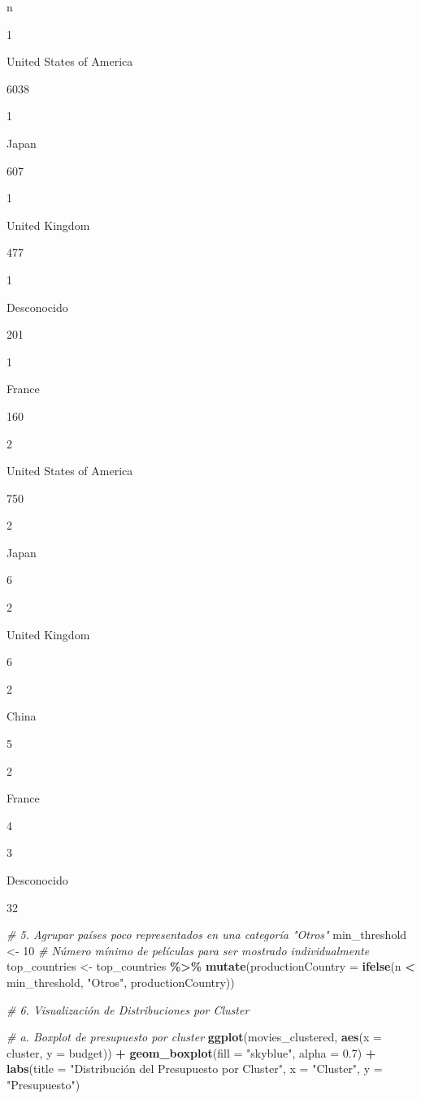 \documentclass[
]{article}
\newenvironment{Shaded}{\begin{snugshade}}{\end{snugshade}}
\newcommand{\AttributeTok}[1]{\textcolor[rgb]{0.13,0.29,0.53}{#1}}
\newcommand{\CommentTok}[1]{\textcolor[rgb]{0.56,0.35,0.01}{\textit{#1}}}
\newcommand{\DecValTok}[1]{\textcolor[rgb]{0.00,0.00,0.81}{#1}}
\newcommand{\FloatTok}[1]{\textcolor[rgb]{0.00,0.00,0.81}{#1}}
\newcommand{\FunctionTok}[1]{\textcolor[rgb]{0.13,0.29,0.53}{\textbf{#1}}}
\newcommand{\NormalTok}[1]{#1}
\newcommand{\OtherTok}[1]{\textcolor[rgb]{0.56,0.35,0.01}{#1}}
\newcommand{\SpecialCharTok}[1]{\textcolor[rgb]{0.81,0.36,0.00}{\textbf{#1}}}
\newcommand{\StringTok}[1]{\textcolor[rgb]{0.31,0.60,0.02}{#1}}
\begin{document}
n

1

United States of America

6038

1

Japan

607

1

United Kingdom

477

1

Desconocido

201

1

France

160

2

United States of America

750

2

Japan

6

2

United Kingdom

6

2

China

5

2

France

4

3

Desconocido

32

\begin{Shaded}
\begin{Highlighting}[]
\CommentTok{\# 5. Agrupar países poco representados en una categoría "Otros"}
\NormalTok{min\_threshold }\OtherTok{\textless{}{-}} \DecValTok{10}  \CommentTok{\# Número mínimo de películas para ser mostrado individualmente}
\NormalTok{top\_countries }\OtherTok{\textless{}{-}}\NormalTok{ top\_countries }\SpecialCharTok{\%\textgreater{}\%}
  \FunctionTok{mutate}\NormalTok{(}\AttributeTok{productionCountry =} \FunctionTok{ifelse}\NormalTok{(n }\SpecialCharTok{\textless{}}\NormalTok{ min\_threshold, }\StringTok{"Otros"}\NormalTok{, productionCountry))}

\CommentTok{\# 6. Visualización de Distribuciones por Cluster}

\CommentTok{\# a. Boxplot de presupuesto por cluster}
\FunctionTok{ggplot}\NormalTok{(movies\_clustered, }\FunctionTok{aes}\NormalTok{(}\AttributeTok{x =}\NormalTok{ cluster, }\AttributeTok{y =}\NormalTok{ budget)) }\SpecialCharTok{+}
  \FunctionTok{geom\_boxplot}\NormalTok{(}\AttributeTok{fill =} \StringTok{"skyblue"}\NormalTok{, }\AttributeTok{alpha =} \FloatTok{0.7}\NormalTok{) }\SpecialCharTok{+}
  \FunctionTok{labs}\NormalTok{(}\AttributeTok{title =} \StringTok{"Distribución del Presupuesto por Cluster"}\NormalTok{, }\AttributeTok{x =} \StringTok{"Cluster"}\NormalTok{, }\AttributeTok{y =} \StringTok{"Presupuesto"}\NormalTok{)}
\end{Highlighting}
\end{Shaded}
\end{document}
